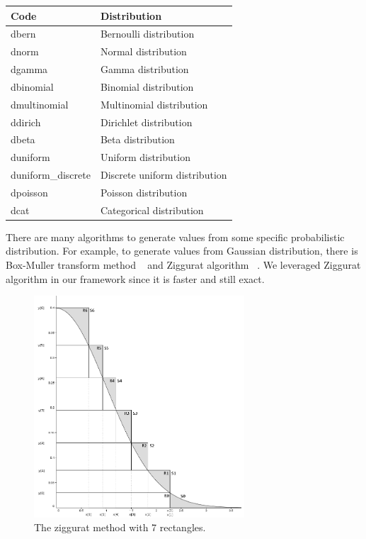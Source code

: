 \begin{center}
\begin{tabular}{|l|l|}
  \hline
  Code & Distribution \\
  \hline
  dbern & Bernoulli distribution \\
  dnorm & Normal distribution \\
  dgamma & Gamma distribution \\ 
  dbinomial & Binomial distribution \\
  dmultinomial & Multinomial distribution \\
  ddirich & Dirichlet distribution\\
  dbeta & Beta distribution \\
  duniform & Uniform distribution \\
  duniform\_discrete & Discrete uniform distribution \\
  dpoisson & Poisson distribution \\
  dcat & Categorical distribution \\
  \hline
\end{tabular}
\end{center}

There are many algorithms to generate values from some specific probabilistic distribution. For example, to generate values from Gaussian distribution, there is Box-Muller transform method ~\cite{box} and Ziggurat algorithm ~\cite{ziggurat}. We leveraged Ziggurat algorithm in our framework since it is faster and still exact. 

\begin{figure}
    \centering
    \includegraphics[width=0.7\textwidth]{figures/ziggurat.png}
    \caption{The ziggurat method with 7 rectangles.}
    \label{fig:ziggurat}
\end{figure}

